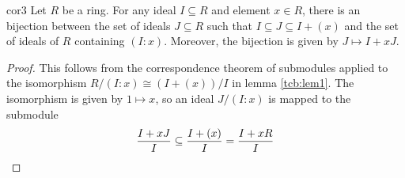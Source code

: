\documentclass[a4paper,10pt]{article}
\theoremstyle{definition}
\newcommand\lref[2][blue!60!black]{lemma \ref{tcb:#2}}
\begin{document}
\begin{corollary}{}{cor3}
Let $R$ be a ring.
For any ideal $I\subseteq R$ and element $x\in R$,
there is an bijection between the set of ideals $J\subseteq R$ 
such that $I\subseteq J\subseteq I+(x)$ and the set of ideals
of $R$ containing $(I:x)$.
Moreover, the bijection is given by $J\mapsto I+xJ$.
\end{corollary}
\begin{proof}
This follows from the correspondence theorem of submodules applied to the 
isomorphism $R/(I:x)\cong(I+(x))/I$ in \lref{lem1}.
The isomorphism is given by $1\mapsto x$, 
so an ideal $J/(I:x)$ is mapped to the submodule 
\begin{equation*}
\frac{I+xJ}{I}\subseteq\frac{I+(x)}{I}=\frac{I+xR}{I}\qedhere
\end{equation*}
\end{proof}
\end{document}
